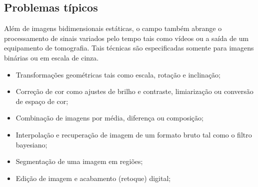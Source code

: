 \subsection{Problemas típicos}
	Além de imagens bidimensionais estáticas, o campo também abrange o processamento de sinais variados pelo tempo tais como vídeos ou a saída de um equipamento de tomografia. Tais técnicas são especificadas somente para imagens binárias ou em escala de cinza.
	\begin{itemize}
		\item Transformações geométricas tais como escala, rotação e inclinação;
		\item Correção de cor como ajustes de brilho e contraste, limiarização ou conversão de espaço de cor;
		\item Combinação de imagens por média, diferença ou composição;
		\item Interpolação e recuperação de imagem de um formato bruto tal como o filtro bayesiano;
		\item Segmentação de uma imagem em regiões;
		\item Edição de imagem e acabamento (retoque) digital;
	\end{itemize}
